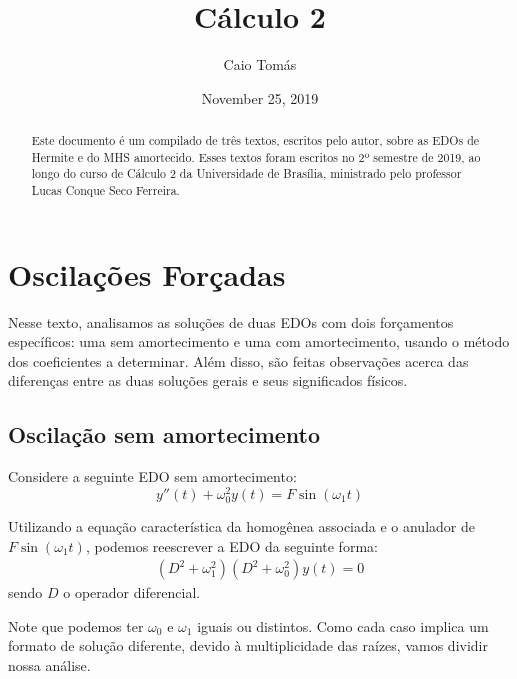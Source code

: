 \documentclass{article}
\title{Cálculo 2}
\author{Caio Tomás}
\date{November 25, 2019}
\begin{document}
\maketitle
\thispagestyle{empty}

\begin{abstract}
    Este documento é um compilado de três textos, escritos pelo autor, sobre as EDOs de Hermite e do MHS amortecido. Esses textos foram escritos no 2º semestre de 2019, ao longo do curso de Cálculo 2 da Universidade de Brasília, ministrado pelo professor Lucas Conque Seco Ferreira.
\end{abstract}


\section{Oscilações Forçadas}
\par Nesse texto, analisamos as soluções de duas EDOs com dois forçamentos específicos: uma sem amortecimento e uma com amortecimento, usando o método dos coeficientes a determinar. Além disso, são feitas observações acerca das diferenças entre as duas soluções gerais e seus significados físicos.

\subsection{Oscilação sem amortecimento}
\par\hspace{12pt} Considere a seguinte EDO sem amortecimento:
\begin{equation}
y''(t) + \omega_0 ^2 y(t) = F\sin(\omega_1 t)
\end{equation}
\par Utilizando a equação característica da homogênea associada e o anulador de $F\sin(\omega_1t)$, podemos reescrever a EDO da seguinte forma:
\begin{align*}
(D^2 + \omega_1^ 2)(D^2 + \omega_0 ^2)y(t) = 0
\end{align*}
sendo $D$ o operador diferencial.
\par Note que podemos ter $\omega_0$ e $\omega_1$ iguais ou distintos. Como cada caso implica um formato de solução diferente, devido à multiplicidade das raízes, vamos dividir nossa análise.
\end{document}
